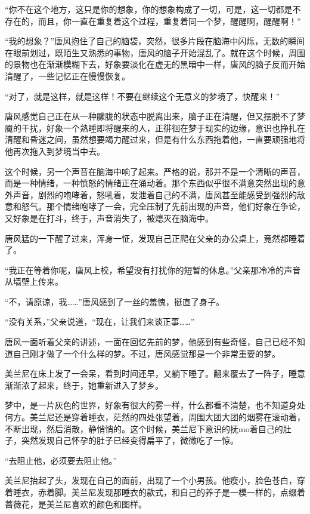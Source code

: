 “你不在这个地方，这只是你的想象，你的想象构成了一切，可是，这一切都是不存在的，而且，你一直在重复着这个过程，重复着同一个梦，醒醒啊，醒醒啊！” 

“我的想象？”唐风抱住了自己的脑袋，突然，很多片段在脑海中闪烁，无数的瞬间在眼前划过，既陌生又熟悉的事物，唐风的脑子开始混乱了。就在这个时候，周围的景物也在渐渐模糊下去，好象要淡化在虚无的黑暗中一样，唐风的脑子反而开始清醒了，一些记忆正在慢慢恢复。 

“对了，就是这样，就是这样！不要在继续这个无意义的梦境了，快醒来！” 

唐风感觉自己正在从一种朦胧的状态中脱离出来，脑子正在清醒，但又摆脱不了梦魇的干扰，好象一个熟睡即将醒来的人，正徘徊在梦于现实的边缘，意识也挣扎在清醒和昏迷之间，虽然想要竭力醒过来，但是有什么东西拖着他，一直要顽强地将他再次拖入到梦境当中去。 

这个时候，另一个声音在脑海中响了起来。严格的说，那并不是一个清晰的声音，而是一种情绪，一种愤怒的情绪正在涌动着。那个东西似乎很不满意突然出现的意外声音，剧烈的咆哮着，怒吼着，发泄着自己的不满，唐风甚至能感受到强烈的敌意和怒气。那个情绪咆哮了一会，完全压制了先前出现的声音，他们好象在争论，又好象是在打斗，终于，声音消失了，被熄灭在脑海中。 

唐风猛的一下醒了过来，浑身一怔，发现自己正爬在父亲的办公桌上，竟然都睡着了。 

“我正在等着你呢，唐风上校，希望没有打扰你的短暂的休息。”父亲那冷冷的声音从墙壁上传来。 

“不，请原谅，我……”唐风感到了一丝的羞愧，挺直了身子。 

“没有关系，”父亲说道，“现在，让我们来谈正事……” 

唐风一面听着父亲的讲述，一面在回忆先前的梦，他感到有些奇怪，自己已经不知道自己刚才做了一个什么样的梦。不过，唐风感觉那是一个非常重要的梦。 

美兰尼在床上发了一会呆，看到时间还早，又躺下睡了。翻来覆去了一阵子，睡意渐渐浓了起来，终于，她重新进入了梦乡。 

梦中，是一片灰色的世界，好象有很大的雾一样，什么都看不清楚，也不知道身处何方。美兰尼还是穿着睡衣，茫然的四处张望着，周围大团大团的烟雾在滚动着，不断出现，然后消散，静悄悄的。这个时候，美兰尼下意识的抚mo着自己的肚子，突然发现自己怀孕的肚子已经变得扁平了，微微吃了一惊。 

“去阻止他，必须要去阻止他。” 

美兰尼抬起了头，发现在自己的面前，出现了一个小男孩。他瘦小，脸色苍白，穿着睡衣，赤着脚。美兰尼发现那睡衣的款式，和自己的养子是一模一样的，点缀着蔷薇花，是美兰尼喜欢的颜色和图样。 

